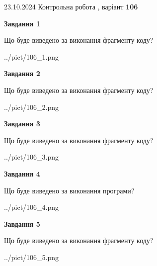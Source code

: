 \documentclass[12pt, ukrainian]{article}
\begin{document}
{\Large{23.10.2024 Контрольна робота , варіант  \No \textbf { 106 }\par}}
{
\begin {large}
{\begin {center}\textbf{Завдання 1}\end {center}}

Що буде виведено за виконання фрагменту коду?\par
\begin{center}
	{../pict/106_1.png}
\end{center}
\newpage

{\begin {center}\textbf{Завдання 2}\end {center}}

Що буде виведено за виконання фрагменту коду?\par
\begin{center}
	{../pict/106_2.png}
\end{center}
\newpage

{\begin {center}\textbf{Завдання 3}\end {center}}

Що буде виведено за виконання фрагменту коду?\par
\begin{center}
	{../pict/106_3.png}
\end{center}
\newpage

{\begin {center}\textbf{Завдання 4}\end {center}}

Що буде виведено за виконання програми?\par
\begin{center}
	{../pict/106_4.png}
\end{center}
\newpage

{\begin {center}\textbf{Завдання 5}\end {center}}

Що буде виведено за виконання фрагменту коду?\par
\begin{center}
	{../pict/106_5.png}
\end{center}
\newpage


\end{large}}
\end{document}
